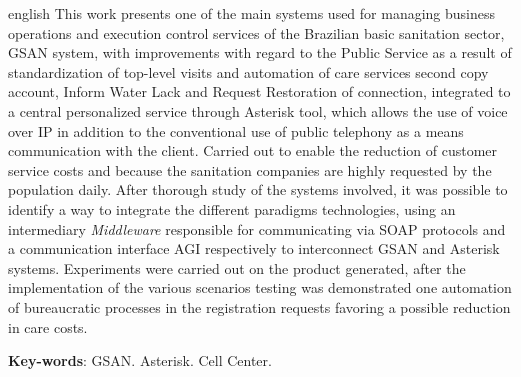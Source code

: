 \begin{resumo}[Abstract]
 \begin{otherlanguage*}{english}
This work presents one of the main systems used for managing business operations and execution control services of the Brazilian basic sanitation sector, GSAN system, with improvements with regard to the Public Service as a result of standardization of top-level visits and automation of care services second copy account, Inform Water Lack and Request Restoration of connection, integrated to a central personalized service through Asterisk tool, which allows the use of voice over IP in addition to the conventional use of public telephony as a means communication with the client. Carried out to enable the reduction of customer service costs and because the sanitation companies are highly requested by the population daily. After thorough study of the systems involved, it was possible to identify a way to integrate the different paradigms technologies, using an intermediary \textit{Middleware} responsible for communicating via SOAP protocols and a communication interface AGI respectively to interconnect GSAN and Asterisk systems. Experiments were carried out on the product generated, after the implementation of the various scenarios testing was demonstrated one automation of bureaucratic processes in the registration requests favoring a possible reduction in care costs.

   \vspace{\onelineskip}
 
   \noindent 
   \textbf{Key-words}: GSAN. Asterisk. Cell Center.
 \end{otherlanguage*}
\end{resumo}